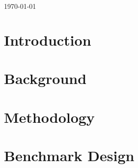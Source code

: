 \documentclass{book}
\let\LaTeXStandardTableOfContents\tableofcontents
\renewcommand{\tableofcontents}{%
\begingroup%
\renewcommand{\bfseries}{\relax}%
\LaTeXStandardTableOfContents%
\endgroup%
}%
\begin{document}
\begin{titlepage}

\vspace{1.5cm}


{\large \today}\\[2cm] %


\vfill %

\end{titlepage}


\tableofcontents



\chapter{Introduction}
\label{chap:intro}


\chapter{Background}
\label{chap:related}


\chapter{Methodology}
\label{chap:methodology}


\chapter{Benchmark Design}
\label{chap:work_plan}






\end{document}

